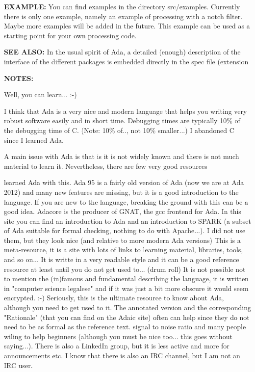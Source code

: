 \documentclass{article}
\begin{document}
\textbf{EXAMPLE:}\hspace{0.08in}
   You can find examples in the directory src/examples.  Currently there
   is only one example, namely an example of processing with a notch filter.
   Maybe more examples will be added in the future. This example can be
   used as a starting point for your own processing code.

\textbf{SEE ALSO:}\hspace{0.08in}
   In the usual spirit of Ada, a detailed (enough) description of 
   the interface of the different packages is embedded directly
   in the spec file (extension

\textbf{NOTES:}\hspace{0.08in}



   Well, you can learn... :-)



   I think that Ada is a very nice and modern language that helps you
   writing very robust software easily and in short time. Debugging times
   are typically 10\% of the debugging time of C. (Note: 10\% of..,
   not 10\% smaller...) I abandoned C since I learned Ada.

   

   A main issue with Ada is that is it is not widely known 
   and there is not much material to learn it.  Nevertheless, there 
   are few very good resources



   learned Ada with this.  Ada 95 is a fairly old version of Ada (now we
   are at Ada 2012) and many new features are missing, but it is a good
   introduction to the language.  If you are new to the language,
   breaking the ground with this can be a good idea.
   Adacore is the
   producer of GNAT, the gcc frontend for Ada. In this site you can find
   an introduction to Ada and an introduction to SPARK (a subset of Ada
   suitable for formal checking, nothing to do with Apache...).  I did
   not use them, but they look nice (and relative to more modern Ada
   versions)
   This is a meta-resource, it is a site with lots of 
   links to learning material, libraries, tools, and so on...
   It is writte in a very readable style and it can be a good reference
   resource at least until you do not get used to... (drum roll)
   It is not possible not to mention the
   (in)famous and
   fundamental
   describing the language, it is written in "computer science
   legalese" and if it was just a bit more obscure it would seem
   encrypted. :-) Seriously, this is the ultimate resource to know
   about Ada, although you need to get used to it.  The annotated
   version and the corresponding "Rationale" (that you can find on the
   Adaic site) often can help since they do not need to be as formal as
   the reference text.
   signal to noise ratio
   and many people wiling to help beginners (although you must be nice
   too... this goes without saying...).  There is also a LinkedIn
   group, but it is less active and more for announcements etc. I know
   that there is also an IRC channel, but I am not an IRC user.
\end{document}
